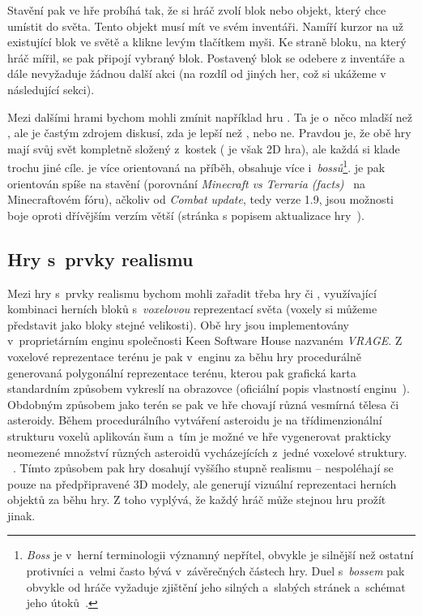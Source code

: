 \FloatBarrier

Stavění pak ve hře probíhá tak, že si hráč zvolí blok nebo objekt, který chce umístit do světa. Tento objekt musí mít ve svém inventáři. Namíří kurzor na už existující blok ve světě a klikne levým tlačítkem myši. Ke straně bloku, na který hráč mířil, se pak připojí vybraný blok. Postavený blok se odebere z inventáře a dále nevyžaduje žádnou další akci (na rozdíl od jiných her, což si ukážeme v následující sekci).


Mezi dalšími hrami bychom mohli zmínit například hru \TE{}. Ta je o~něco mladší než \MC{}, ale je častým zdrojem diskusí, zda je lepší než \MC{}, nebo ne. Pravdou je, že obě hry mají svůj svět kompletně složený z~kostek (\TE{} je však 2D hra), ale každá si klade trochu jiné cíle. \TE{} je více orientovaná na příběh, obsahuje více \NPC{} i~\textit{bossů}\footnote{\textit{Boss} je v~herní terminologii významný nepřítel, obvykle je silnější než ostatní protivníci a~velmi často bývá v~závěrečných částech hry. Duel s~\textit{bossem} pak obvykle od hráče vyžaduje zjištění jeho silných a~slabých stránek a~schémat jeho útoků~\citep{intro_boss}.}. \MC{} je pak orientován spíše na stavění (porovnání \textit{Minecraft vs Terraria (facts)}~\citep{mc_te_comparsion} na Minecraftovém fóru), ačkoliv od \textit{Combat update}, tedy verze 1.9, jsou možnosti boje oproti dřívějším verzím větší (stránka s popisem aktualizace hry~\citep{mc_combat}). 


\subsection{Hry s~prvky realismu}

Mezi hry s~prvky realismu bychom mohli zařadit třeba hry \SE{} či \ME{}, využívající kombinaci herních bloků s~\textit{voxelovou} reprezentací světa (voxely si můžeme představit jako bloky stejné velikosti). Obě hry jsou implementovány v~proprietárním enginu společnosti Keen Software House nazvaném \textit{VRAGE}\texttrademark{}. Z voxelové reprezentace terénu je pak v~enginu za běhu hry procedurálně generovaná polygonální reprezentace terénu, kterou pak grafická karta standardním způsobem vykreslí na obrazovce (oficiální popis vlastností enginu~\citep{vrage}). Obdobným způsobem jako terén se pak ve hře \SE{} chovají různá vesmírná tělesa či asteroidy. Během procedurálního vytváření asteroidu je na třídimenzionální strukturu voxelů aplikován šum a~tím je možné ve hře vygenerovat prakticky neomezené množství různých asteroidů vycházejících z~jedné voxelové struktury. ~\citep{rosa_blog}. Tímto způsobem pak hry dosahují vyššího stupně realismu -- nespoléhají se pouze na předpřipravené 3D modely, ale generují vizuální reprezentaci herních objektů za běhu hry. Z toho vyplývá, že každý hráč může stejnou hru prožít jinak. 

